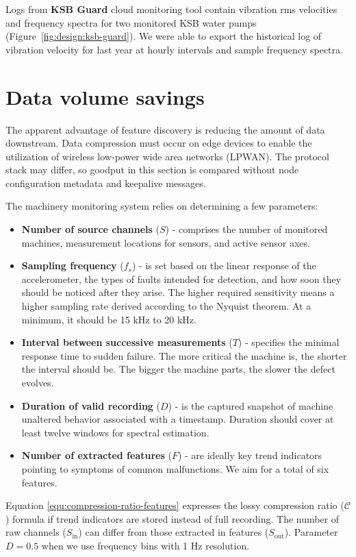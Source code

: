 Logs from \textbf{KSB Guard} cloud monitoring tool contain vibration rms velocities and frequency spectra for two monitored KSB water pumps (Figure~\ref{fig:design:ksb-guard}). We were able to export the historical log of vibration velocity for last year at hourly intervals and sample frequency spectra. 

\section{Data volume savings}
The apparent advantage of feature discovery is reducing the amount of data downstream. Data compression must occur on edge devices to enable the utilization of wireless low-power wide area networks (LPWAN). The protocol stack may differ, so goodput in this section is compared without node configuration metadata and keepalive messages. 

The machinery monitoring system relies on determining a few parameters:
\begin{itemize}
\itemsep0pt
\item \textbf{Number of source channels} ($S$) - comprises the number of monitored machines, measurement locations for sensors, and active sensor axes.
\item \textbf{Sampling frequency} ($f_s$) - is set based on the linear response of the accelerometer, the types of faults intended for detection, and how soon they should be noticed after they arise. The higher required sensitivity means a higher sampling rate derived according to the Nyquist theorem. At a minimum, it should be 15 kHz to 20 kHz.
\item \textbf{Interval between successive measurements} ($T$) - specifies the minimal response time to sudden failure. The more critical the machine is, the shorter the interval should be. The bigger the machine parts, the slower the defect evolves.
\item \textbf{Duration of valid recording} ($D$) - is the captured snapshot of machine unaltered behavior associated with a timestamp. Duration should cover at least twelve windows for spectral estimation.
\item \textbf{Number of extracted features} ($F$) - are ideally key trend indicators pointing to symptoms of common malfunctions. We aim for a total of six features.
\end{itemize}

Equation \ref{equ:compression-ratio-features} expresses the lossy compression ratio ($\mathcal{C}$) formula if trend indicators are stored instead of full recording. The number of raw channels ($S_{\mathrm{in}}$) can differ from those extracted in features ($S_{\mathrm{out}}$). Parameter $D = 0.5$ when we use frequency bins with 1 Hz resolution.

